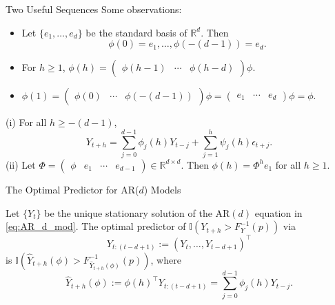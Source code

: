 \documentclass{beamer}
\def\I{\mathbb I}
\def\R{\mathbb R}
\newcommand{\AROptPred}[3]{\hat{Y}_{#1 + #2}(#3)}
\begin{document}
\begin{frame}{Two Useful Sequences}
    Some observations:
    \begin{itemize}
        \item Let $\{e_1, \ldots, e_d\}$ be the standard basis of $\R^d$. Then
        \[
        \phi(0) = e_1, \ldots, \phi(-(d - 1)) = e_d.
        \]
        \item For $h \ge 1$, $\phi(h) = (\begin{matrix} \phi(h - 1) & \cdots & \phi(h - d) \end{matrix})\phi$.
        \item $\phi(1) = (\begin{matrix} \phi(0) & \cdots & \phi(-(d - 1)) \end{matrix})\phi = (\begin{matrix} e_1 & \cdots & e_d \end{matrix})\phi = \phi$.
    \end{itemize}
    \begin{lemma}
        (i) For all $h \ge -(d - 1)$,
        \[
        Y_{t + h} = \sum_{j = 0}^{d - 1} \phi_j(h)Y_{t - j} + \sum_{j = 1}^h \psi_j(h)\epsilon_{t + j}.
        \]
        (ii) Let $\Phi = (\begin{matrix} \phi & e_1 & \cdots & e_{d - 1} \end{matrix}) \in \R^{d \times d}$. Then $\phi(h) = \Phi^h e_1$ for all $h \ge 1$.
    \end{lemma}
\end{frame}

\begin{frame}{The Optimal Predictor for AR($d$) Models}
    \begin{theorem}
        Let $\{Y_t\}$ be the unique stationary solution of the AR$(d)$ equation in \eqref{eq:AR_d_mod}.
        The optimal predictor of $\I(Y_{t + h} > F_Y^{-1}(p))$ via
        \[
        Y_{t:(t - d + 1)} := (Y_t, \ldots, Y_{t - d + 1})^{\top}
        \]
        is $\I(\AROptPred{t}{h}{\phi} > F_{\AROptPred{t}{h}{\phi}}^{-1}(p))$, where
        \[
        \AROptPred{t}{h}{\phi} := \phi(h)^{\top}Y_{t:(t - d + 1)} = \sum_{j = 0}^{d - 1} \phi_j(h)Y_{t - j}.
        \]
    \end{theorem}
\end{frame}
\end{document}
